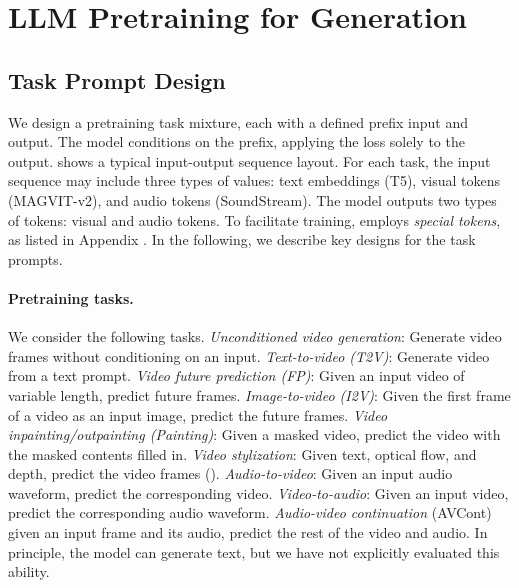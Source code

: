 \vspace{-2mm}
\section{LLM Pretraining for Generation} 
\label{sec:modeling}
\vspace{-1mm}


\subsection{Task Prompt Design}
\label{sec:task_prompt_design}
\vspace{-2mm}

We design a pretraining task mixture, each with a defined prefix input and output. The model conditions on the prefix, applying the loss solely to the output.
%
 shows a typical input-output sequence layout.
%
For each task, the input sequence may include three types of values: text embeddings (T5), visual tokens (MAGVIT-v2), and audio tokens (SoundStream). 
%
The model outputs two types of tokens: visual and audio tokens. To facilitate training, \modelname{} employs \emph{special tokens}, as listed in Appendix . 
%
In the following, we describe key designs for the task prompts.

\vspace{-4mm}
\paragraph{Pretraining tasks.}
We consider the following tasks. \emph{Unconditioned video generation}: Generate video frames without conditioning on an input. \emph{Text-to-video (T2V)}: Generate video from a text prompt. \emph{Video future prediction (FP)}: Given an input video of variable length, predict future frames. \emph{Image-to-video (I2V)}: Given the first frame of a video as an input image, predict the future frames. \emph{Video inpainting/outpainting (Painting)}: Given a masked video, predict the video with the masked contents filled in. \emph{Video stylization}: Given text, optical flow, and depth, predict the video frames (). \emph{Audio-to-video}: Given an input audio waveform, predict the corresponding video. \emph{Video-to-audio}: Given an input video, predict the corresponding audio waveform.
\emph{Audio-video continuation} (AVCont) given an input frame and its audio, predict the rest of the video and audio. In principle, the model can generate text, but we have not explicitly evaluated this ability.



